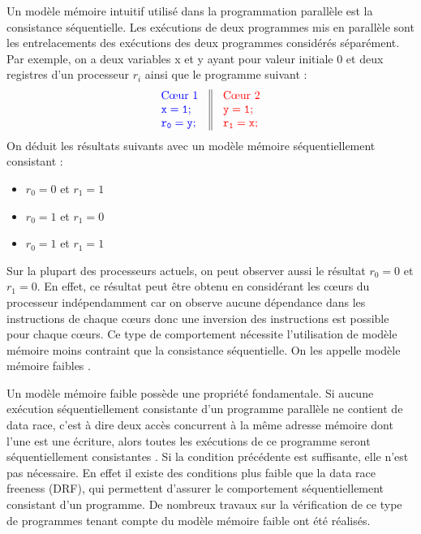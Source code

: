 \documentclass[12pt,a4paper]{article}
\begin{document}
Un modèle mémoire intuitif utilisé dans la programmation parallèle est la consistance séquentielle. Les exécutions de deux programmes mis en parallèle sont les entrelacements des exécutions des deux programmes considérés séparément. Par exemple, on a deux variables x et y ayant pour valeur initiale 0 et deux registres d'un processeur $r_i$ ainsi que le programme suivant :
\[
\begin{array}{c||c}
  \begin{array}{l}
    \textcolor[rgb]{0,0,1}{\text{C\oe{}ur 1}} \\
    \textcolor[rgb]{0,0,1}{\mathtt{x = 1;}} \\
    \textcolor[rgb]{0,0,1}{\mathtt{r_0 = y;}} \\
  \end{array} &
  \begin{array}{l}
    \textcolor[rgb]{1,0,0}{\text{C\oe{}ur 2}} \\
    \textcolor[rgb]{1,0,0}{\mathtt{y = 1;}} \\
    \textcolor[rgb]{1,0,0}{\mathtt{r_1 = x;}} \\
  \end{array}
\end{array}
\]
On déduit les résultats suivants avec un modèle mémoire séquentiellement consistant :
\begin{itemize}
	\item $r_0 = 0$ et $r_1 = 1$
	\item $r_0 = 1$ et $r_1 = 0$
	\item $r_0 = 1$ et $r_1 = 1$
\end{itemize} 
Sur la plupart des processeurs actuels, on peut observer aussi le résultat $r_0 = 0$ et $r_1 = 0$. En effet, ce résultat peut être obtenu en considérant les cœurs du processeur indépendamment car on observe aucune dépendance dans les instructions de chaque cœurs donc une inversion des instructions est possible pour chaque cœurs. Ce type de comportement nécessite l'utilisation de modèle mémoire moins contraint que la consistance séquentielle. On les appelle modèle mémoire faibles \cite{Adve:1996:SMC:619013.620590}. 

Un modèle mémoire faible possède une propriété fondamentale. Si aucune exécution séquentiellement consistante d'un programme parallèle ne contient de data race, c'est à dire deux accès concurrent  à la même adresse mémoire dont l'une est une écriture, alors toutes les exécutions de ce programme seront séquentiellement consistantes \cite{Saraswat:2007:TMM:1229428.1229469}.
Si la condition précédente est suffisante, elle n'est pas nécessaire. En effet il existe des conditions plus faible que la data race freeness (DRF), qui permettent d'assurer le comportement séquentiellement consistant d'un programme. De nombreux travaux sur la vérification de ce type de programmes tenant compte du modèle mémoire faible ont été réalisés.
\end{document}
